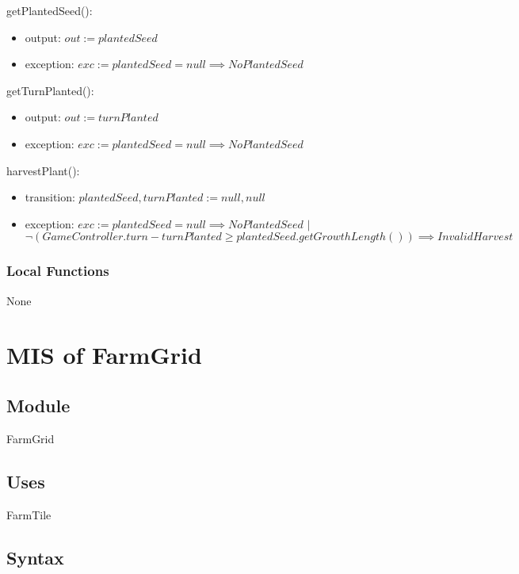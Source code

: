 \documentclass[12pt, titlepage]{article}
\begin{document}
\noindent getPlantedSeed():
\begin{itemize}
\item output: $out := plantedSeed$
\item exception: $exc := plantedSeed = null \implies NoPlantedSeed$
\end{itemize}

\noindent getTurnPlanted():
\begin{itemize}
\item output: $out := turnPlanted$
\item exception: $exc := plantedSeed = null \implies NoPlantedSeed$
\end{itemize}

\noindent harvestPlant():
\begin{itemize}
\item transition: $plantedSeed, turnPlanted := null, null$
\item exception: $exc := plantedSeed = null \implies NoPlantedSeed$ $|$ $\neg(GameController.turn - turnPlanted \ge plantedSeed.getGrowthLength()) \implies InvalidHarvest$
\end{itemize}

\subsubsection{Local Functions}
 
None
  
\medskip
\newpage

\section{MIS of FarmGrid} \label{FarmGrid} 

\subsection{Module}

FarmGrid

\subsection{Uses}

FarmTile

\subsection{Syntax}
\end{document}
